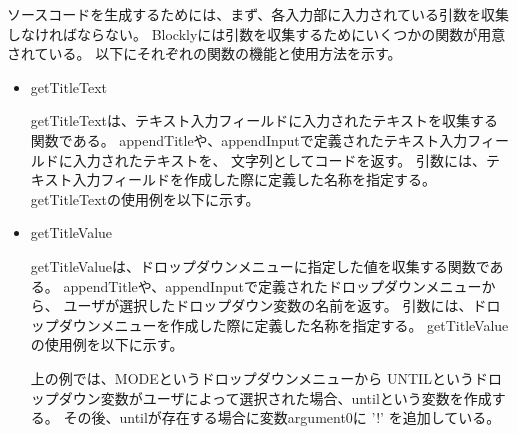 \documentclass{risepaper}
\begin{document}
ソースコードを生成するためには、まず、各入力部に入力されている引数を収集しなければならない。
Blocklyには引数を収集するためにいくつかの関数が用意されている。
以下にそれぞれの関数の機能と使用方法を示す。

\begin{itemize}
\item getTitleText

getTitleTextは、テキスト入力フィールドに入力されたテキストを収集する関数である。
appendTitleや、appendInputで定義されたテキスト入力フィールドに入力されたテキストを、
文字列としてコードを返す。
引数には、テキスト入力フィールドを作成した際に定義した名称を指定する。
getTitleTextの使用例を以下に示す。


\end{itemize}

\begin{itemize}
\item getTitleValue

getTitleValueは、ドロップダウンメニューに指定した値を収集する関数である。
appendTitleや、appendInputで定義されたドロップダウンメニューから、
ユーザが選択したドロップダウン変数の名前を返す。
引数には、ドロップダウンメニューを作成した際に定義した名称を指定する。
getTitleValueの使用例を以下に示す。


上の例では、MODEというドロップダウンメニューから
UNTILというドロップダウン変数がユーザによって選択された場合、untilという変数を作成する。
その後、untilが存在する場合に変数argument0に '!' を追加している。

\end{itemize}
\end{document}
